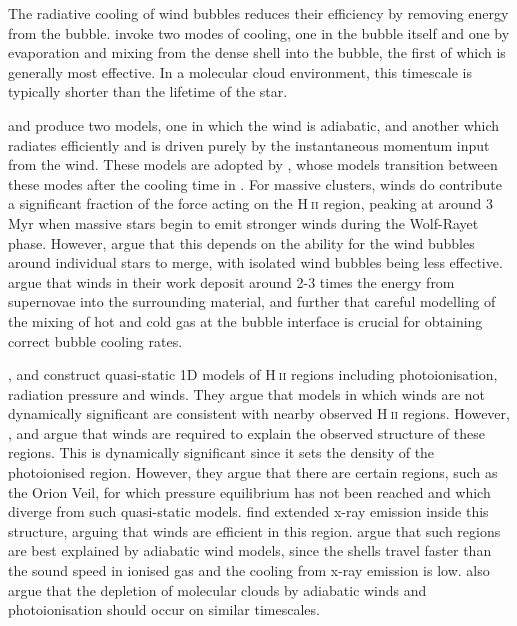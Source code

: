 \documentclass[a4paper,fleqn,usenatbib]{mnras}
\newcommand{\HII}{H$~$\textsc{ii}\xspace}
\begin{document}
The radiative cooling of wind bubbles reduces their efficiency by removing energy from the bubble. \cite{MacLow1988} invoke two modes of cooling, one in the bubble itself and one by evaporation and mixing from the dense shell into the bubble, the first of which is generally most effective. In a molecular cloud environment, this timescale is typically shorter than the lifetime of the star. 

\cite{Silich2013} and \cite{Silich2018} produce two models, one in which the wind is adiabatic, and another which radiates efficiently and is driven purely by the instantaneous momentum input from the wind. These models are adopted by \cite{Rahner2017}, whose models transition between these modes after the cooling time in \cite{MacLow1988}. For massive clusters, winds do contribute a significant fraction of the force acting on the \HII region, peaking at around 3 Myr when massive stars begin to emit stronger winds during the Wolf-Rayet phase. However, \cite{Silich2017} argue that this depends on the ability for the wind bubbles around individual stars to merge, with isolated wind bubbles being less effective. \cite{Fierlinger2016} argue that winds in their work deposit around 2-3 times the energy from supernovae into the surrounding material, and further that careful modelling of the mixing of hot and cold gas at the bubble interface is crucial for obtaining correct bubble cooling rates.

\cite{Harper-Clark2009}, \cite{Yeh2012} and \cite{Yeh2013} construct quasi-static 1D models of \HII regions including photoionisation, radiation pressure and winds. They argue that models in which winds are not dynamically significant are consistent with nearby observed \HII regions. However, \cite{Pellegrini2007}, \cite{Pellegrini2011} and \cite{Pellegrini2012} argue that winds are required to explain the observed structure of these regions. This is dynamically significant since it sets the density of the photoionised region. However, they argue that there are certain regions, such as the Orion Veil, for which pressure equilibrium has not been reached and which diverge from such quasi-static models. \cite{Guedel2007} find extended x-ray emission inside this structure, arguing that winds are efficient in this region. \cite{Pabst2019} argue that such regions are best explained by adiabatic wind models, since the shells travel faster than the sound speed in ionised gas and the cooling from x-ray emission is low. \cite{Kruijssen2019} also argue that the depletion of molecular clouds by adiabatic winds and photoionisation should occur on similar timescales. 
\end{document}
